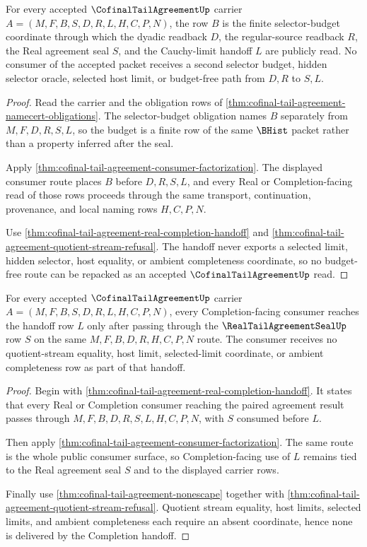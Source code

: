 \begin{theorem}
\label{thm:cofinal-tail-agreement-selector-budget-readback}
For every accepted $\CofinalTailAgreementUp$ carrier $A=(M,F,B,S,D,R,L,H,C,P,N)$, the row $B$ is the finite selector-budget coordinate through which the dyadic readback $D$, the regular-source readback $R$, the Real agreement seal $S$, and the Cauchy-limit handoff $L$ are publicly read. No consumer of the accepted packet receives a second selector budget, hidden selector oracle, selected host limit, or budget-free path from $D,R$ to $S,L$.
\end{theorem}
\begin{proof}
Read the carrier and the obligation rows of \autoref{thm:cofinal-tail-agreement-namecert-obligations}. The selector-budget obligation names $B$ separately from $M,F,D,R,S,L$, so the budget is a finite row of the same $\BHist$ packet rather than a property inferred after the seal.

Apply \autoref{thm:cofinal-tail-agreement-consumer-factorization}. The displayed consumer route places $B$ before $D,R,S,L$, and every Real or Completion-facing read of those rows proceeds through the same transport, continuation, provenance, and local naming rows $H,C,P,N$.

Use \autoref{thm:cofinal-tail-agreement-real-completion-handoff} and \autoref{thm:cofinal-tail-agreement-quotient-stream-refusal}. The handoff never exports a selected limit, hidden selector, host equality, or ambient completeness coordinate, so no budget-free route can be repacked as an accepted $\CofinalTailAgreementUp$ read.
\end{proof}

\begin{theorem}
\label{thm:cofinal-tail-agreement-seal-handoff-coverage}
For every accepted $\CofinalTailAgreementUp$ carrier $A=(M,F,B,S,D,R,L,H,C,P,N)$, every Completion-facing consumer reaches the handoff row $L$ only after passing through the $\RealTailAgreementSealUp$ row $S$ on the same $M,F,B,D,R,H,C,P,N$ route. The consumer receives no quotient-stream equality, host limit, selected-limit coordinate, or ambient completeness row as part of that handoff.
\end{theorem}
\begin{proof}
Begin with \autoref{thm:cofinal-tail-agreement-real-completion-handoff}. It states that every Real or Completion consumer reaching the paired agreement result passes through $M,F,B,D,R,S,L,H,C,P,N$, with $S$ consumed before $L$.

Then apply \autoref{thm:cofinal-tail-agreement-consumer-factorization}. The same route is the whole public consumer surface, so Completion-facing use of $L$ remains tied to the Real agreement seal $S$ and to the displayed carrier rows.

Finally use \autoref{thm:cofinal-tail-agreement-nonescape} together with \autoref{thm:cofinal-tail-agreement-quotient-stream-refusal}. Quotient stream equality, host limits, selected limits, and ambient completeness each require an absent coordinate, hence none is delivered by the Completion handoff.
\end{proof}

